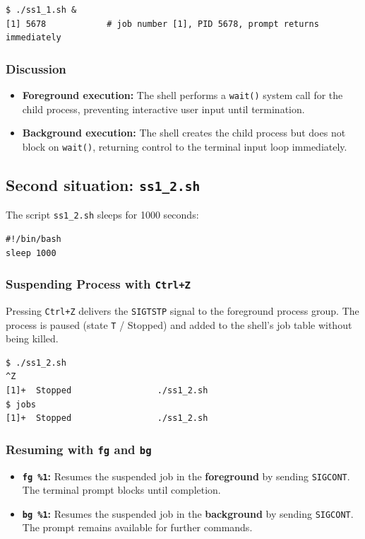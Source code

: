 \documentclass[11pt,a4paper]{article}
\begin{document}
\begin{lstlisting}[style=termstyle]
$ ./ss1_1.sh &
[1] 5678            # job number [1], PID 5678, prompt returns immediately
\end{lstlisting}

\subsubsection*{Discussion}
\begin{itemize}[leftmargin=1.5em]
    \item \textbf{Foreground execution:} The shell performs a \texttt{wait()} system call for the child process, preventing interactive user input until termination.
    \item \textbf{Background execution:} The shell creates the child process but does not block on \texttt{wait()}, returning control to the terminal input loop immediately.
\end{itemize}

\subsection{Second situation: \texttt{ss1\_2.sh}}

The script \texttt{ss1\_2.sh} sleeps for 1000 seconds:

\begin{lstlisting}[style=bashstyle]
#!/bin/bash
sleep 1000
\end{lstlisting}

\subsubsection*{Suspending Process with \texttt{Ctrl+Z}}
Pressing \texttt{Ctrl+Z} delivers the \texttt{SIGTSTP} signal to the foreground process group. The process is paused (state \texttt{T} / Stopped) and added to the shell's job table without being killed.

\begin{lstlisting}[style=termstyle]
$ ./ss1_2.sh
^Z
[1]+  Stopped                 ./ss1_2.sh
$ jobs
[1]+  Stopped                 ./ss1_2.sh
\end{lstlisting}

\subsubsection*{Resuming with \texttt{fg} and \texttt{bg}}
\begin{itemize}[leftmargin=1.5em]
    \item \textbf{\texttt{fg \%1}:} Resumes the suspended job in the \textbf{foreground} by sending \texttt{SIGCONT}. The terminal prompt blocks until completion.
    \item \textbf{\texttt{bg \%1}:} Resumes the suspended job in the \textbf{background} by sending \texttt{SIGCONT}. The prompt remains available for further commands.
\end{itemize}
\end{document}
